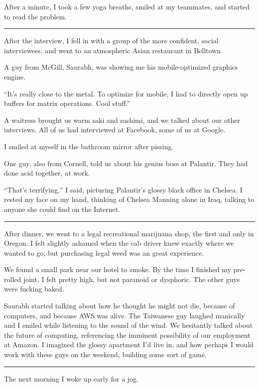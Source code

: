 After a minute, I took a few yoga breaths, smiled at my teammates, and started
to read the problem.

\plainfancybreak{12pt}{2}{* * *}

After the interview, I fell in with a group of the more confident, social
interviewees, and went to an atmospheric Asian restaurant in Belltown.

A guy from McGill, Saurabh, was showing me his mobile-optimized graphics engine.

``It's really close to the metal.  To optimize for mobile, I had to directly
open up buffers for matrix operations.  Cool stuff.''

A waitress brought us warm saki and sashimi, and we talked about our other
interviews.  All of us had interviewed at Facebook, some of us at Google.  

I smiled at myself in the bathroom mirror after pissing.

One guy, also from Cornell, told us about his genius boss at Palantir.  They had
done acid together, at work.

``That's terrifying,'' I said, picturing Palantir's glossy black office in
Chelsea.  I rested my face on my hand, thinking of Chelsea Manning alone in
Iraq, talking to anyone she could find on the Internet.

\plainfancybreak{12pt}{2}{* * *}

After dinner, we went to a legal recreational marijuana shop, the first and only
in Oregon.  I felt slightly ashamed when the cab driver knew exactly where we
wanted to go, but purchasing legal weed was an great experience.

We found a small park near our hotel to smoke.  By the time I finished my
pre-rolled joint, I felt pretty high, but not paranoid or dysphoric.  The other
guys were fucking baked. 

Saurabh started talking about how he thought he might not die, because of
computers, and because AWS was alive.  The Taiwanese guy laughed manically and I
smiled while listening to the sound of the wind.  We hesitantly talked about the
future of computing, referencing the imminent possibility of our employment at
Amazon.  I imagined the glossy apartment I'd live in, and how perhaps I would
work with these guys on the weekend, building some sort of game. 

\plainfancybreak{12pt}{2}{* * *}

The next morning I woke up early for a jog.

